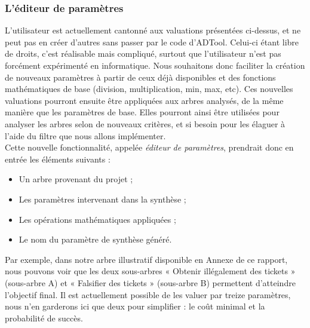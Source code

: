 		\subsubsection{L'éditeur de paramètres}
			\label{subsec::EditParam}

			L'utilisateur est actuellement cantonné aux valuations présentées ci-dessus, et ne peut pas en créer d'autres sans passer par le code d'ADTool. Celui-ci étant libre de droits, c'est réalisable mais compliqué, surtout que l'utilisateur n'est pas forcément expérimenté en informatique. %
			Nous souhaitons donc faciliter la création de nouveaux paramètres à partir de ceux déjà disponibles et des fonctions mathématiques de base (division, multiplication, min, max, etc). Ces nouvelles valuations pourront ensuite être appliquées aux arbres analysés, de la même manière que les paramètres de base. Elles pourront ainsi être utilisées pour analyser les arbres selon de nouveaux critères, et si besoin pour les élaguer à l'aide du filtre que nous allons implémenter.\\

			Cette nouvelle fonctionnalité, appelée \emph{éditeur de paramètres}, prendrait donc en entrée les éléments suivants :
			\begin{itemize}%
				\item Un arbre provenant du projet ; %
				\item Les paramètres intervenant dans la synthèse ;
				\item Les opérations mathématiques appliquées ;
				\item Le nom du paramètre de synthèse généré.
			\end{itemize}

			Par exemple, dans notre arbre illustratif disponible en Annexe de ce rapport, nous pouvons voir que les deux sous-arbres « Obtenir illégalement des tickets » (sous-arbre A) et « Falsifier des tickets » (sous-arbre B) permettent d'atteindre l'objectif final. Il est actuellement possible de les valuer par treize paramètres, nous n'en garderons ici que deux pour simplifier : le coût minimal et la probabilité de succès.\\ %

